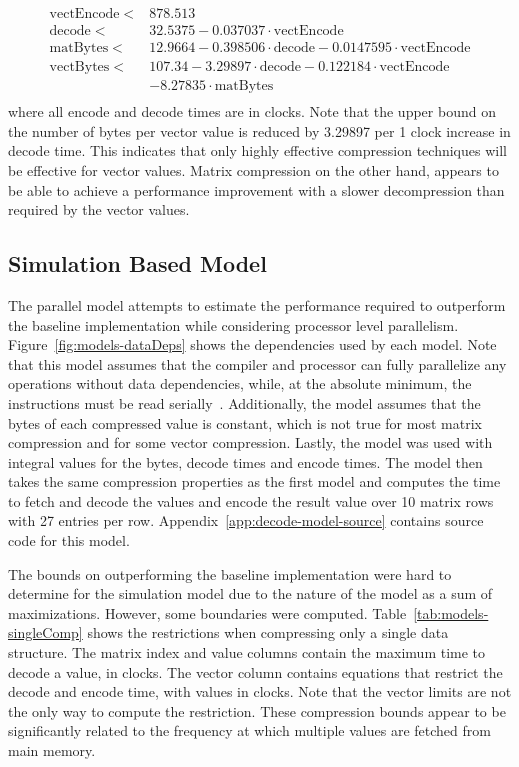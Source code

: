 \begin{align*}
\mathrm{vectEncode} <& 878.513 \\
\mathrm{decode} <& 32.5375 - 0.037037\cdot\mathrm{vectEncode} \\
\mathrm{matBytes} <& 12.9664 - 0.398506\cdot\mathrm{decode}- 0.0147595\cdot\mathrm{vectEncode}\\
\mathrm{vectBytes} <& 107.34  - 3.29897\cdot\mathrm{decode} - 0.122184\cdot\mathrm{vectEncode} \\
	&- 8.27835\cdot\mathrm{matBytes}\\
\end{align*}
where all encode and decode times are in clocks.
Note that the upper bound on the number of bytes per vector value is reduced by 3.29897 per 1 clock increase in decode time.
This indicates that only highly effective compression techniques will be effective for vector values.
Matrix compression on the other hand, appears to be able to achieve a performance improvement with a slower decompression than required by the vector values.

\subsection{Simulation Based Model}
The parallel model attempts to estimate the performance required to outperform the baseline implementation while considering processor level parallelism.
Figure~\ref{fig:models-dataDeps} shows the dependencies used by each model.
Note that this model assumes that the compiler and processor can fully parallelize any operations without data dependencies, while, at the absolute minimum, the instructions must be read serially~\cite{Hennessy:1990:ComputerArchitecture}.
Additionally, the model assumes that the bytes of each compressed value is constant, which is not true for most matrix compression and for some vector compression.
Lastly, the model was used with integral values for the bytes, decode times and encode times.
The model then takes the same compression properties as the first model and computes the time to fetch and decode the values and encode the result value over 10 matrix rows with 27 entries per row.
Appendix~\ref{app:decode-model-source} contains source code for this model.



The bounds on outperforming the baseline implementation were hard to determine for the simulation model due to the nature of the model as a sum of maximizations.
However, some boundaries were computed.
%
%
Table~\ref{tab:models-singleComp} shows the restrictions when compressing only a single data structure.
The matrix index and value columns contain the maximum time to decode a value, in clocks.
The vector column contains equations that restrict the decode and encode time, with values in clocks.
Note that the vector limits are not the only way to compute the restriction.
These compression bounds appear to be significantly related to the frequency at which multiple values are fetched from main memory.



